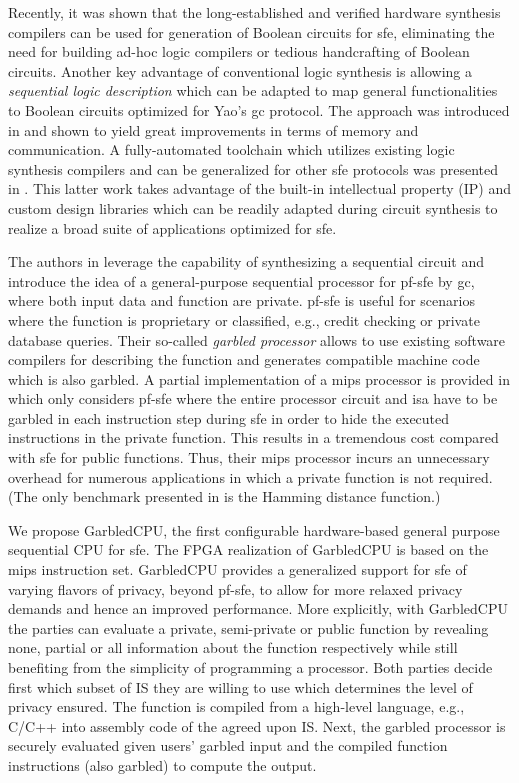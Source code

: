 Recently, it was shown that the long-established and verified hardware synthesis compilers can be used for generation of Boolean circuits for \acrshort{sfe}, eliminating the need for building ad-hoc logic compilers or tedious handcrafting of Boolean circuits. Another key advantage of conventional logic synthesis is allowing a \emph{sequential logic description} which can be adapted to map general functionalities to Boolean circuits optimized for Yao's \acrshort{gc} protocol. The approach was introduced in \cite{songhori2015tinygarble} and shown to yield great improvements in terms of memory and communication. A fully-automated toolchain which utilizes existing logic synthesis compilers and can be generalized for other \acrshort{sfe} protocols was presented in \cite{demmler2015automated}. This latter work takes advantage of the built-in intellectual property (IP) and custom design libraries which can be readily adapted during circuit synthesis to realize a broad suite of applications optimized for \acrshort{sfe}.

The authors in \cite{songhori2015tinygarble} leverage the capability of synthesizing a sequential circuit and introduce the idea of a general-purpose sequential processor for \acrfull{pf-sfe} by \acrshort{gc}, where both input data and function are private. \acrshort{pf-sfe} is useful for scenarios where the function is proprietary or classified, e.g., credit checking or private database queries. Their so-called \emph{garbled processor} allows to use existing software compilers for describing the function and generates compatible machine code which is also garbled. A partial implementation of a \gls{mips} processor is provided in \cite{songhori2015tinygarble} which only considers \acrshort{pf-sfe} where the entire processor circuit and \acrfull{isa} have to be garbled in each instruction step during \acrshort{sfe} in order to hide the executed instructions in the private function. This results in a tremendous cost compared with \acrshort{sfe} for public functions. Thus, their \gls{mips} processor incurs an unnecessary overhead for numerous applications in which a private function is not required. (The only benchmark presented in \cite{songhori2015tinygarble} is the Hamming distance function.)

We propose GarbledCPU, the first configurable hardware-based general purpose sequential CPU for \acrshort{sfe}. The FPGA realization of GarbledCPU is based on the \gls{mips} instruction set. GarbledCPU provides a generalized support for \acrshort{sfe} of varying flavors of privacy, beyond \acrshort{pf-sfe}, to allow for more relaxed privacy demands and hence an improved performance. More explicitly, with GarbledCPU the parties can evaluate a private, semi-private or public function by revealing none, partial or all information about the function respectively while still benefiting from the simplicity of programming a processor.
Both parties decide first which subset of IS they are willing to use which determines the level of privacy ensured. The function is compiled from a high-level language, e.g., C/C++ into assembly code of the agreed upon IS. Next, the garbled processor is securely evaluated given users' garbled input and the compiled function instructions (also garbled) to compute the output.

